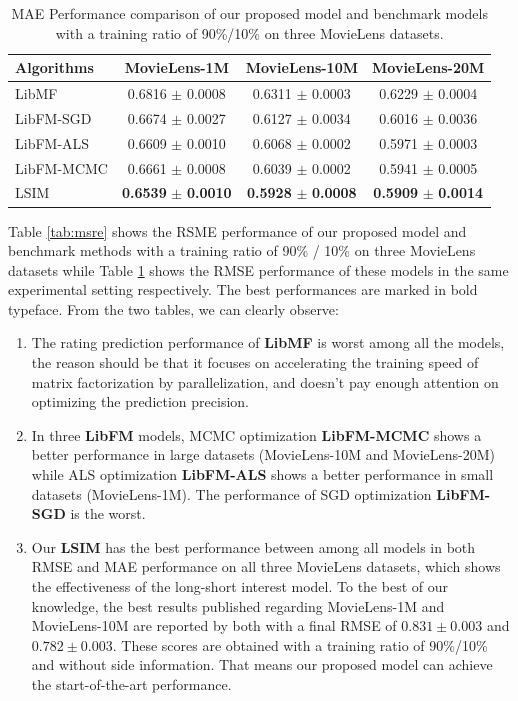 \documentclass{sig-alternate-05-2015}
\begin{document}
\begin{table}[htbp]
	\centering
	\caption{MAE Performance comparison of our proposed model and benchmark models
    with a training ratio of 90\%/10\% on three MovieLens datasets.}
	\label{tab:mae}
	\begin{tabular}{|l|c|c|c|}
		\hline
		\textbf{Algorithms} & \textbf{MovieLens-1M} & \textbf{MovieLens-10M} & \textbf{MovieLens-20M} \\
		\hline
		LibMF      & 0.6816 $\pm$ 0.0008 & 0.6311 $\pm$ 0.0003 & 0.6229 $\pm$ 0.0004 \\
		LibFM-SGD  & 0.6674 $\pm$ 0.0027 & 0.6127 $\pm$ 0.0034 & 0.6016 $\pm$ 0.0036 \\
		LibFM-ALS  & 0.6609 $\pm$ 0.0010 & 0.6068 $\pm$ 0.0002 & 0.5971 $\pm$ 0.0003 \\
        LibFM-MCMC & 0.6661 $\pm$ 0.0008 & 0.6039 $\pm$ 0.0002 & 0.5941 $\pm$ 0.0005 \\
		LSIM       & \textbf{0.6539} $\pm$ \textbf{0.0010} & \textbf{0.5928} $\pm$ \textbf{0.0008} & \textbf{0.5909} $\pm$ \textbf{0.0014} \\
		\hline
	\end{tabular}
\end{table}

Table \ref{tab:msre} shows the RSME performance of our proposed model and benchmark methods 
with a training ratio of 90\% / 10\% on three MovieLens datasets while Table \ref{tab:mae}
shows the RMSE performance of these models in the same experimental setting respectively.
The best performances are marked in bold typeface.
From the two tables, we can clearly observe:
\begin{enumerate}
\item The rating prediction performance of \textbf{LibMF} is worst among all the models,
the reason should be that it focuses on accelerating the training speed of matrix
factorization by parallelization, and doesn't pay enough attention on optimizing
the prediction precision.
\item In three \textbf{LibFM} models, MCMC optimization \textbf{LibFM-MCMC} shows
a better performance in large datasets (MovieLens-10M and MovieLens-20M) while
ALS optimization \textbf{LibFM-ALS} shows a better performance in small datasets
(MovieLens-1M). The performance of SGD optimization \textbf{LibFM-SGD} is the worst.
\item Our \textbf{LSIM} has the best performance between among all models in both RMSE
and MAE performance on all three MovieLens datasets, which shows the effectiveness
of the long-short interest model. To the best of our knowledge, the best results
published regarding MovieLens-1M and MovieLens-10M are reported by both
\cite{lee2013local, sedhain2015autorec} with a final RMSE of $0.831 \pm 0.003$
and $0.782 \pm 0.003$. These scores are obtained with a training ratio of
90\%/10\% and without side information. That means our proposed model can achieve
the start-of-the-art performance.
\end{enumerate}
\end{document}
